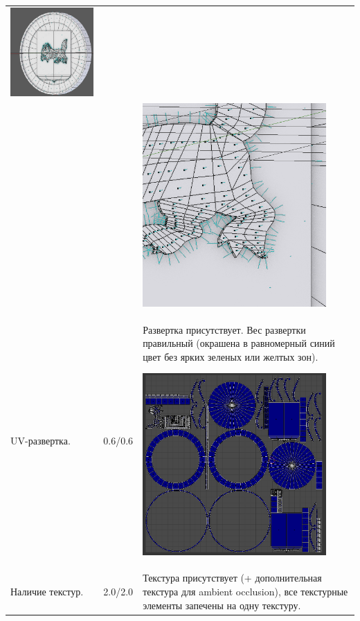 \begin{longtable}{|p{4cm}|p{2.5cm}|p{7.5cm}|}
    \includegraphics[width=7cm]{src/norm_a1} \\
    & & \includegraphics[width=7cm]{src/norm_a2} \\
    \hline    
    UV-развертка. & 0.6/0.6 & Развертка присутствует. Вес развертки правильный (окрашена в равномерный синий цвет без ярких зеленых или желтых зон).

    \includegraphics[width=7cm]{src/uv_a1}\\
    \hline
    Наличие текстур. & 2.0/2.0 & Текстура присутствует (+ дополнительная текстура для ambient occlusion), все текстурные элементы запечены на одну текстуру.


\end{longtable}

